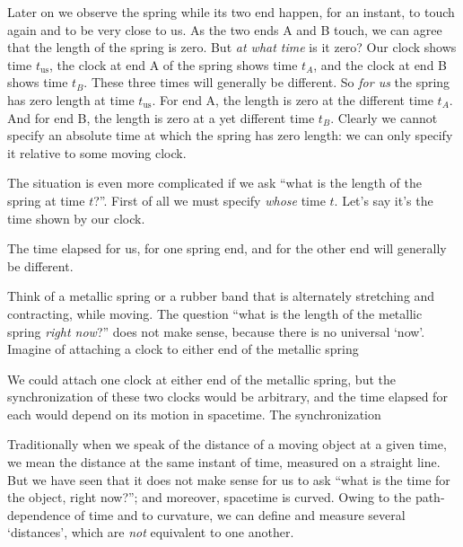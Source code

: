 Later on we observe the spring while its two end happen, for an instant, to touch again and to be very close to us. As the two ends A and B touch, we can agree that the length of the spring is zero. But \emph{at what time} is it zero? Our clock shows time $t_{\textrm{us}}$, the clock at end A of the spring shows time $t_{A}$, and the clock at end B shows time $t_{B}$. These three times will generally be different. So \emph{for us} the spring has zero length at time $t_{\textrm{us}}$. For end A, the length is zero at the different time $t_{A}$. And for end B, the length is zero at a yet different time $t_{B}$. Clearly we cannot specify an absolute time at which the spring has zero length: we can only specify it relative to some moving clock.

The situation is even more complicated if we ask \enquote{what is the length of the spring at time $t$?}. First of all we must specify \emph{whose} time $t$. Let's say it's the time shown by our clock.


The time elapsed for us, for one spring end, and for the other end will generally be different.



Think of a metallic spring or a rubber band that is alternately stretching and contracting, while moving. The question \enquote{what is the length of the metallic spring \emph{right now}?} does not make sense, because there is no universal \enquote*{now}. Imagine of attaching a clock to either end of the metallic spring


We could attach one clock at either end of the metallic spring, but the synchronization of these two clocks would be arbitrary, and the time elapsed for each would depend on its motion in spacetime. The synchronization 

Traditionally when we speak of the distance of a moving object at a given time, we mean the distance at the same instant of time, measured on a straight line. But we have seen that it does not make sense for us to ask \enquote{what is the time for the object, right now?}; and moreover, spacetime is curved. Owing to the path-dependence of time and to curvature, we can define and measure several \enquote*{distances}, which are \emph{not} equivalent to one another.




